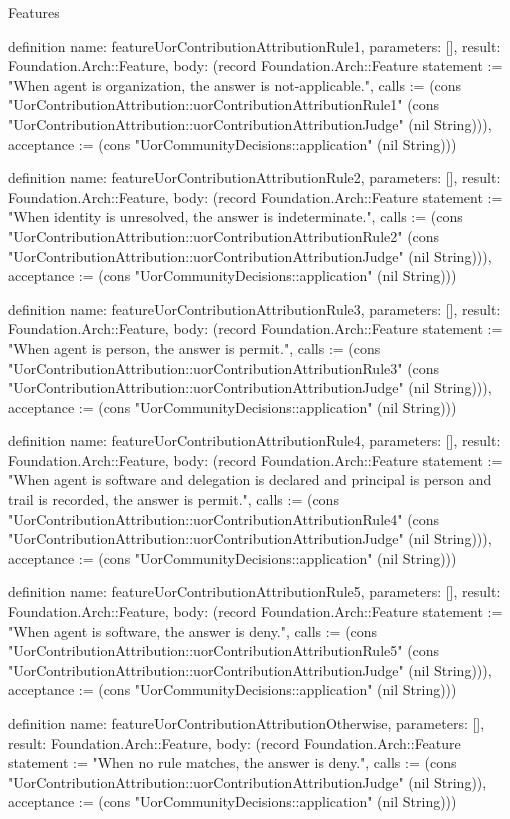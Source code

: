 \begin{lexlean}{Features}
\begin{semanticmodule}
definition{
  name: featureUorContributionAttributionRule1,
  parameters: [],
  result: Foundation.Arch::Feature,
  body: (record Foundation.Arch::Feature {statement := "When agent is organization, the answer is not-applicable.", calls := (cons "UorContributionAttribution::uorContributionAttributionRule1" (cons "UorContributionAttribution::uorContributionAttributionJudge" (nil String))), acceptance := (cons "UorCommunityDecisions::application" (nil String))})
}

definition{
  name: featureUorContributionAttributionRule2,
  parameters: [],
  result: Foundation.Arch::Feature,
  body: (record Foundation.Arch::Feature {statement := "When identity is unresolved, the answer is indeterminate.", calls := (cons "UorContributionAttribution::uorContributionAttributionRule2" (cons "UorContributionAttribution::uorContributionAttributionJudge" (nil String))), acceptance := (cons "UorCommunityDecisions::application" (nil String))})
}

definition{
  name: featureUorContributionAttributionRule3,
  parameters: [],
  result: Foundation.Arch::Feature,
  body: (record Foundation.Arch::Feature {statement := "When agent is person, the answer is permit.", calls := (cons "UorContributionAttribution::uorContributionAttributionRule3" (cons "UorContributionAttribution::uorContributionAttributionJudge" (nil String))), acceptance := (cons "UorCommunityDecisions::application" (nil String))})
}

definition{
  name: featureUorContributionAttributionRule4,
  parameters: [],
  result: Foundation.Arch::Feature,
  body: (record Foundation.Arch::Feature {statement := "When agent is software and delegation is declared and principal is person and trail is recorded, the answer is permit.", calls := (cons "UorContributionAttribution::uorContributionAttributionRule4" (cons "UorContributionAttribution::uorContributionAttributionJudge" (nil String))), acceptance := (cons "UorCommunityDecisions::application" (nil String))})
}

definition{
  name: featureUorContributionAttributionRule5,
  parameters: [],
  result: Foundation.Arch::Feature,
  body: (record Foundation.Arch::Feature {statement := "When agent is software, the answer is deny.", calls := (cons "UorContributionAttribution::uorContributionAttributionRule5" (cons "UorContributionAttribution::uorContributionAttributionJudge" (nil String))), acceptance := (cons "UorCommunityDecisions::application" (nil String))})
}

definition{
  name: featureUorContributionAttributionOtherwise,
  parameters: [],
  result: Foundation.Arch::Feature,
  body: (record Foundation.Arch::Feature {statement := "When no rule matches, the answer is deny.", calls := (cons "UorContributionAttribution::uorContributionAttributionJudge" (nil String)), acceptance := (cons "UorCommunityDecisions::application" (nil String))})
}


\end{semanticmodule}
\end{lexlean}
